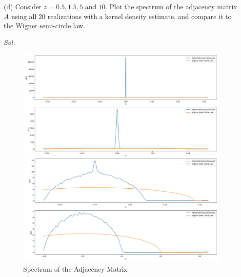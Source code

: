 \begin{enumerate}
    \item[(d)] Consider $z = 0.5, 1.5, 5$ and $10$. Plot the spectrum of the adjacency matrix $A$ using all $20$ realizations with a kernel density estimate, and compare it to the Wigner semi-circle law. 
    
    \textit{ Sol. }
    
    \begin{figure}[htbp]
        \centering
        \includegraphics[width=16cm]{./Programming/Q3-3-D.png}
        \caption{Spectrum of the Adjacency Matrix}
    \end{figure}
\end{enumerate}

